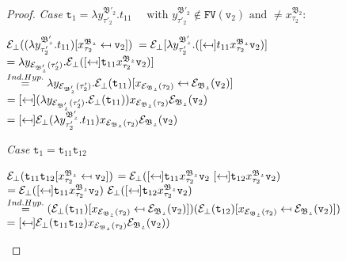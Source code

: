 \begin{proof}
\noindent\textit{Case} 
$\texttt{t}_{1} = \lambda y^{\mathfrak{B'_{2}}}_{\tau'_{2}}. t_{11} \quad
\text{ with }   y^{\mathfrak{B'_{2}}}_{\tau'_{2}}  
\not\in \texttt{FV}(\texttt{v}_{2}) \text{ and } \neq 
x^{\mathfrak{B_{2}}}_{\tau_{2}} : $
\begin{center}
 $\mathcal{E}_{\bot}
	((\lambda y^{\mathfrak{B'_{2}}}_{\tau'_{2}}. t_{11}) [x^{\mathfrak{B_{2}}}_{\tau_{2}} \mapsfrom \texttt{v}_{2}]) 	$
	$ = \e_{\bot}[\lambda y^{\mathfrak{B'_{2}}}_{\tau'_{2}}.
	(\sbst
		{ t_{11}}
		{x^{\mathfrak{B_{2}}}_{\tau_{2}}}
		{\texttt{v}_{2}})] $\\[0.08cm]
$	= \lambda y_{\e_{\mathfrak{B'_{2}}}(\tau'_{2})}.
		\e_{\bot}(
		\sbst
			{\texttt{t}_{11}}
			{x^{\mathfrak{B_{2}}}_{\tau_{2}}}
			{\texttt{v}_{2}})] $\\[0.08cm]
	$  \stackrel{Ind.Hyp.}{=} 
	\lambda y_{\mathcal{E}_{\mathfrak{B'_{2}}}(\tau'_{2})}.		
		\mathcal{E}_{\bot}(\texttt{t}_{11}) [x_{\mathcal{E}_{\mathfrak{B_{2}}}(\tau_{2})} \mapsfrom \mathcal{E}_{\mathfrak{B_{2}}}(\texttt{v}_{2})]$ \\[0.08cm]
	$= \sbst
			{(\lambda y_{\e_{\mathfrak{B'_{2}}}(\tau'_{2})}.\e_{\bot}(\texttt{t}_{11}))}
			{x_{\e_{\mathfrak{B_{2}}}(\tau_{2})}}
			{\e_{\mathfrak{B_{2}}}(\texttt{v}_{2})}$ \\[0.08cm]
	$ = 
	\sbst
			{\e_{\bot}(\lambda y^{\mathfrak{B'_{2}}}_{\tau'_{2}}. t_{11}) }
			{x_{\e_{\mathfrak{B_{2}}}(\tau_{2})}}
			{\e_{\mathfrak{B_{2}}}(\texttt{v}_{2})}$
\end{center}

\noindent\textit{Case} 
$\texttt{t}_{1} = \texttt{t}_{11}\texttt{t}_{12} $
\begin{center}
 $\mathcal{E}_{\bot}
	(\texttt{t}_{11}\texttt{t}_{12} [x^{\mathfrak{B_{2}}}_{\tau_{2}} \mapsfrom \texttt{v}_{2}]) 	$ 
	$= \e_{\bot}
	(\sbst
		{\texttt{t}_{11}}
		{x^{\mathfrak{B_{2}}}_{\tau_{2}}}
		{\texttt{v}_{2}} ~
	\sbst
		{\texttt{t}_{12}}
		{x^{\mathfrak{B_{2}}}_{\tau_{2}}}
		{\texttt{v}_{2}}) 	  $ \\[0.08cm]
		$= \e_{\bot}
	(\sbst
		{\texttt{t}_{11}}
		{x^{\mathfrak{B_{2}}}_{\tau_{2}}}
		{\texttt{v}_{2}}) ~
	\e_{\bot}(\sbst
		{\texttt{t}_{12}}
		{x^{\mathfrak{B_{2}}}_{\tau_{2}}}
		{\texttt{v}_{2}}) 	  $ \\[0.08cm]
		$ \stackrel{Ind.Hyp.}{=} 
		(\mathcal{E}_{\bot}({\texttt{t}_{11}}) [x_{\mathcal{E}_{\mathfrak{B_{2}}}(\tau_{2})} \mapsfrom \mathcal{E}_{\mathfrak{B_{2}}}(\texttt{v}_{2})])	
				(\mathcal{E}_{\bot}({\texttt{t}_{12}}) [x_{\mathcal{E}_{\mathfrak{B_{2}}}(\tau_{2})} \mapsfrom \mathcal{E}_{\mathfrak{B_{2}}}(\texttt{v}_{2})])	
		 $ \\[0.08cm]
	$ = 
	\sbst
		{\e_{\bot}(\texttt{t}_{11} \texttt{t}_{12})}
		{x_{\e_{\mathfrak{B_{2}}}(\tau_{2})}}
		{\e_{\mathfrak{B_{2}}}(\texttt{v}_{2})})	
	$\\[0.08cm]

\end{center}
 \end{proof}








